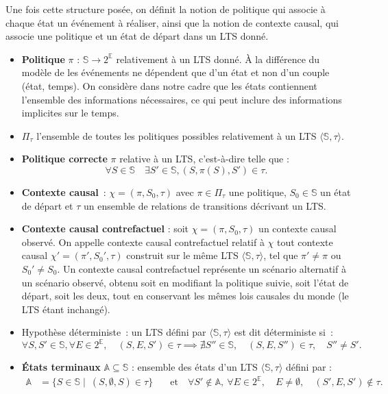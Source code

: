 Une fois cette structure posée, on définit la notion de politique qui associe à chaque état un événement à réaliser, ainsi que la notion de contexte causal, qui associe une politique et un état de départ dans un LTS donné.
\begin{itemize}
    \item \textbf{Politique} $\pi$ : $\mathds{S} \to 2^{\mathds{E}}$ relativement à un LTS donné. À la différence du modèle de \textcite{sarmiento_formalising_2025} les événements ne dépendent que d'un état et non d'un couple (état, temps). On considère dans notre cadre que les états contiennent l'ensemble des informations nécessaires, ce qui peut inclure des informations implicites sur le temps.

    \item $\Pi_\tau$ l'ensemble de toutes les politiques possibles relativement à un LTS $\langle\mathds{S},\tau\rangle$.
    \item \textbf{Politique correcte} $\pi$ relative à un LTS, c'est-à-dire telle que : $$\forall S \in \mathds{S} \quad \exists S'\in \mathds{S}, (S, \pi(S),S')\in \tau.$$
    \item \textbf{Contexte causal} : $\chi = (\pi, S_0,\tau)$ avec $\pi \in \Pi_\tau$ une politique, $S_0\in \mathds{S}$ un état de départ et $\tau$ un ensemble de relations de transitions décrivant un LTS. 
    \item \textbf{Contexte causal contrefactuel} : soit $\chi = (\pi, S_0, \tau)$ un contexte causal observé. On appelle contexte causal contrefactuel relatif à $\chi$ tout contexte causal $\chi' = (\pi', S_0', \tau)$ construit sur le même LTS $\langle \mathds{S},\tau\rangle$, tel que $\pi' \neq \pi$ ou $S_0' \neq S_0$. Un contexte causal contrefactuel représente un scénario alternatif à un scénario observé, obtenu soit en modifiant la politique suivie, soit l'état de départ, soit les deux, tout en conservant les mêmes lois causales du monde (le LTS étant inchangé).
    
    \item Hypothèse déterministe : un LTS défini par $\langle\mathds{S},\tau\rangle$ est dit déterministe si : 
        \begin{equation*}
            \forall S,S'\in \mathds{S}, \forall E\in 2^{\mathds{E}}, \quad (S,E,S')\in \tau \implies \nexists S'' \in \mathds{S}, \quad (S,E,S'')\in \tau, \quad S'' \neq S'.
        \end{equation*}
    \item \textbf{États terminaux } $\mathds{A} \subseteq \mathds{S}$ : ensemble des états d'un LTS $\langle\mathds{S},\tau\rangle$ défini par :
        \begin{equation*}
        \begin{aligned}
            \mathds{A} &= \{ S\in \mathds{S} \mid\ (S,\emptyset,S) \in \tau \} 
                    &\quad \text{et} \quad \forall S' \notin \mathds{A},\ \forall E \in 2^{\mathds{E}},\quad E \neq \emptyset, \quad (S',E,S')\notin \tau.
        \end{aligned}
        \end{equation*}
    \end{itemize}

